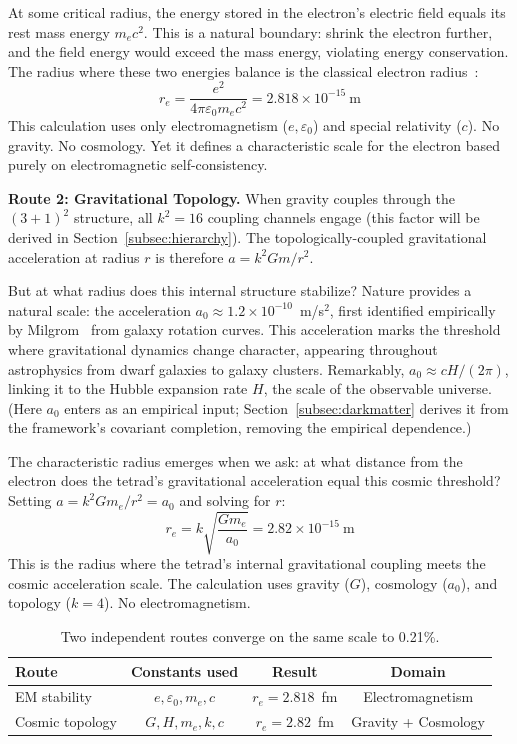 \documentclass[aps,prd,preprint,superscriptaddress,showpacs,preprintnumbers,amsmath,amssymb,nofootinbib]{revtex4-2}
\begin{document}
At some critical radius, the energy stored in the electron's electric field equals its rest mass energy $m_e c^2$. This is a natural boundary: shrink the electron further, and the field energy would exceed the mass energy, violating energy conservation. The radius where these two energies balance is the classical electron radius~\cite{jackson1999}:
\begin{equation}
r_e = \frac{e^2}{4\pi\varepsilon_0 m_e c^2} = 2.818 \times 10^{-15}~\text{m}
\end{equation}
This calculation uses only electromagnetism ($e, \varepsilon_0$) and special relativity ($c$). No gravity. No cosmology. Yet it defines a characteristic scale for the electron based purely on electromagnetic self-consistency.

\textbf{Route 2: Gravitational Topology.} When gravity couples through the $(3+1)^2$ structure, all $k^2 = 16$ coupling channels engage (this factor will be derived in Section~\ref{subsec:hierarchy}). The topologically-coupled gravitational acceleration at radius $r$ is therefore $a = k^2 Gm/r^2$.

But at what radius does this internal structure stabilize? Nature provides a natural scale: the acceleration $a_0 \approx 1.2 \times 10^{-10}$~m/s$^2$, first identified empirically by Milgrom~\cite{milgrom1983} from galaxy rotation curves. This acceleration marks the threshold where gravitational dynamics change character, appearing throughout astrophysics from dwarf galaxies to galaxy clusters. Remarkably, $a_0 \approx cH/(2\pi)$, linking it to the Hubble expansion rate $H$, the scale of the observable universe. (Here $a_0$ enters as an empirical input; Section~\ref{subsec:darkmatter} derives it from the framework's covariant completion, removing the empirical dependence.)

The characteristic radius emerges when we ask: at what distance from the electron does the tetrad's gravitational acceleration equal this cosmic threshold? Setting $a = k^2 Gm_e/r^2 = a_0$ and solving for $r$:
\begin{equation}
r_e = k\sqrt{\frac{Gm_e}{a_0}} = 2.82 \times 10^{-15}~\text{m}
\end{equation}
This is the radius where the tetrad's internal gravitational coupling meets the cosmic acceleration scale. The calculation uses gravity ($G$), cosmology ($a_0$), and topology ($k = 4$). No electromagnetism.

\begin{table}[H]
\centering
\begin{tabular*}{0.95\textwidth}{@{\extracolsep{\fill}} lccc @{}}
\toprule
\textbf{Route} & \textbf{Constants used} & \textbf{Result} & \textbf{Domain} \\
\midrule
EM stability & $e, \varepsilon_0, m_e, c$ & $r_e = 2.818$~fm & Electromagnetism \\
Cosmic topology & $G, H, m_e, k, c$ & $r_e = 2.82$~fm & Gravity + Cosmology \\
\bottomrule
\end{tabular*}
\caption{Two independent routes converge on the same scale to 0.21\%.}
\label{tab:convergence}
\end{table}
\end{document}
